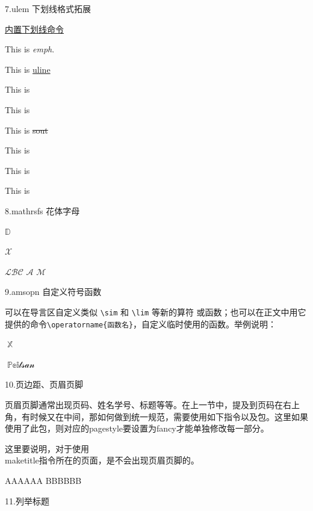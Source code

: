\documentclass[withoutpreface,bwprint]{cumcmthesis}
\DeclareMathOperator{\Sign}{\mathbb{P}\mathbb{e}\mathbb{i}\mathcal{t}\mathcal{s}\mathcal{a}\mathcal{n}}
\DeclareMathOperator{\tx}{\mathbb{X}}
\begin{document}
	\newpage
	\noindent 7.ulem 下划线格式拓展
	
	\underline{内置下划线命令}
	
	This is \emph{emph}. %
	
	This is \uline{uline} %
	
	This is  %
	
	This is  %
	
	This is \sout{sout} %
	
	This is  %
	
	This is  %
	
	This is \par %
	
	\noindent 8.mathrsfs 花体字母
	
	$\mathbb{D}$
	
	$\mathcal{X}$ 
	
	$\mathscr{LBC}$  $\mathscr{A}$  $\mathscr{M}$
	
	\noindent 9.amsopn 自定义符号函数
	
	
	可以在导言区自定义类似 \verb*|\sim| 和 \verb*|\lim| 等新的算符 或函数；也可以在正文中用它提供的命令\verb*|\operatorname{函数名}|，自定义临时使用的函数。举例说明：
	
	$\tx$
	
	$\Sign$
	
	\newpage
	
	\newpage
	
	\noindent 10.页边距、页眉页脚
	
	页眉页脚通常出现页码、姓名学号、标题等等。在上一节中，提及到页码在右上角，有时候又在中间，那如何做到统一规范，需要使用如下指令以及包。这里如果使用了此包，则对应的pagestyle要设置为fancy才能单独修改每一部分。
	
	
	这里要说明，对于使用\\maketitle指令所在的页面，是不会出现页眉页脚的。
	
	\newpage %
	\pagestyle{headings}%
	AAAAAA
	\newpage %
	\pagestyle{plain}%
	BBBBBB
	\newpage%
	\pagestyle{empty}%
	
	
	11.列举标题
		
\end{document}
